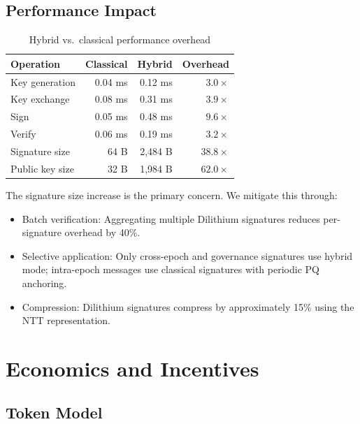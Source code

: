 \documentclass[11pt,a4paper]{article}
\begin{document}
\subsection{Performance Impact}

\begin{table}[H]
\centering
\caption{Hybrid vs.\ classical performance overhead}
\label{tab:pq_perf}
\begin{tabular}{lrrr}
\toprule
\textbf{Operation} & \textbf{Classical} & \textbf{Hybrid} & \textbf{Overhead} \\
\midrule
Key generation & 0.04 ms & 0.12 ms & $3.0\times$ \\
Key exchange & 0.08 ms & 0.31 ms & $3.9\times$ \\
Sign & 0.05 ms & 0.48 ms & $9.6\times$ \\
Verify & 0.06 ms & 0.19 ms & $3.2\times$ \\
Signature size & 64 B & 2{,}484 B & $38.8\times$ \\
Public key size & 32 B & 1{,}984 B & $62.0\times$ \\
\bottomrule
\end{tabular}
\end{table}

The signature size increase is the primary concern. We mitigate this through:
\begin{itemize}
    \item Batch verification: Aggregating multiple Dilithium signatures reduces per-signature overhead by 40\%.
    \item Selective application: Only cross-epoch and governance signatures use hybrid mode; intra-epoch messages use classical signatures with periodic PQ anchoring.
    \item Compression: Dilithium signatures compress by approximately 15\% using the NTT representation.
\end{itemize}

\section{Economics and Incentives}
\label{sec:economics}

\subsection{Token Model}
\end{document}
